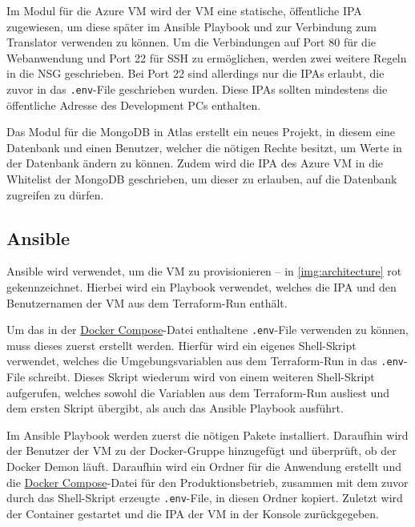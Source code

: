 Im Modul für die Azure \ac{VM} wird der \ac{VM} eine statische, öffentliche \ac{IPA} zugewiesen, um diese später im Ansible Playbook und zur Verbindung zum Translator verwenden zu können. Um die Verbindungen auf Port 80 für die Webanwendung und Port 22 für \ac{SSH} zu ermöglichen, werden zwei weitere Regeln in die \ac{NSG} geschrieben. Bei Port 22 sind allerdings nur die \acp{IPA} erlaubt, die zuvor in das \lstinline{.env}-File geschrieben wurden. Diese \acp{IPA} sollten mindestens die öffentliche Adresse des Development \acp{PC} enthalten.

Das Modul für die MongoDB in Atlas erstellt ein neues Projekt, in diesem eine Datenbank und einen Benutzer, welcher die nötigen Rechte besitzt, um Werte in der Datenbank ändern zu können. Zudem wird die \ac{IPA} des Azure \ac{VM} in die Whitelist der MongoDB geschrieben, um dieser zu erlauben, auf die Datenbank zugreifen zu dürfen.

\subsection{Ansible}\label{c:3_ss:ansible}
Ansible wird verwendet, um die \ac{VM} zu provisionieren -- in \autoref{img:architecture} rot gekennzeichnet. Hierbei wird ein Playbook verwendet, welches die \ac{IPA} und den Benutzernamen der \ac{VM} aus dem Terraform-Run enthält.

Um das in der \hyperref[c:3_ss:docker-compose]{Docker Compose}-Datei enthaltene \lstinline{.env}-File verwenden zu können, muss dieses zuerst erstellt werden. Hierfür wird ein eigenes Shell-Skript verwendet, welches die Umgebungsvariablen aus dem Terraform-Run in das \lstinline{.env}-File schreibt. Dieses Skript wiederum wird von einem weiteren Shell-Skript aufgerufen, welches sowohl die Variablen aus dem Terraform-Run ausliest und dem ersten Skript übergibt, als auch das Ansible Playbook ausführt.

Im Ansible Playbook werden zuerst die nötigen Pakete installiert. Daraufhin wird der Benutzer der \ac{VM} zu der Docker-Gruppe hinzugefügt und überprüft, ob der Docker Demon läuft. Daraufhin wird ein Ordner für die Anwendung erstellt und die \hyperref[c:3_ss:docker-compose]{Docker Compose}-Datei für den Produktionsbetrieb, zusammen mit dem zuvor durch das  Shell-Skript erzeugte \lstinline{.env}-File, in diesen Ordner kopiert. Zuletzt wird der Container gestartet und die \ac{IPA} der \ac{VM} in der Konsole zurückgegeben.

